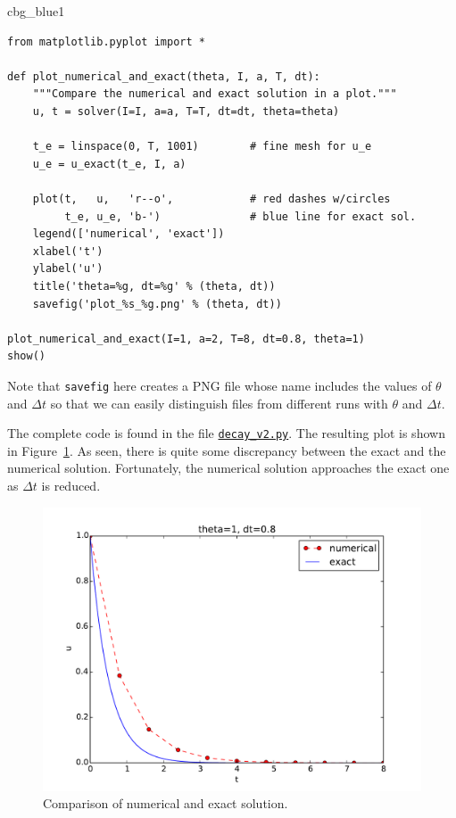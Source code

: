 \documentclass[%
oneside,                 %
final,                   %
10pt]{article}
\newenvironment{_cod_tight}[1]{
   \def\FrameCommand{\colorbox{#1}}
   \FrameRule0.6pt\MakeFramed {\FrameRestore}\vskip3mm}
   {\vskip0mm\endMakeFramed}
\newenvironment{cod}[1]{
\bgroup\rmfamily
\fboxsep=0mm\relax
\begin{_cod_tight}{#1}
\list{}{\parsep=-2mm\parskip=0mm\topsep=0pt\leftmargin=2mm
\rightmargin=2\leftmargin\leftmargin=4pt\relax}
\item\relax}
{\endlist\end{_cod_tight}\egroup}
\begin{document}
\begin{cod}{cbg_blue1}\begin{Verbatim}[numbers=none,fontsize=\fontsize{9pt}{9pt},baselinestretch=0.95,xleftmargin=2mm]
from matplotlib.pyplot import *

def plot_numerical_and_exact(theta, I, a, T, dt):
    """Compare the numerical and exact solution in a plot."""
    u, t = solver(I=I, a=a, T=T, dt=dt, theta=theta)

    t_e = linspace(0, T, 1001)        # fine mesh for u_e
    u_e = u_exact(t_e, I, a)

    plot(t,   u,   'r--o',            # red dashes w/circles
         t_e, u_e, 'b-')              # blue line for exact sol.
    legend(['numerical', 'exact'])
    xlabel('t')
    ylabel('u')
    title('theta=%g, dt=%g' % (theta, dt))
    savefig('plot_%s_%g.png' % (theta, dt))

plot_numerical_and_exact(I=1, a=2, T=8, dt=0.8, theta=1)
show()
\end{Verbatim}
\end{cod}
\noindent
Note that \texttt{savefig} here creates a PNG file whose name includes the
values of $\theta$ and $\Delta t$ so that we can easily distinguish
files from different runs with $\theta$ and $\Delta t$.

The complete code is found in the file
\href{{http://tinyurl.com/ofkw6kc/alg/decay_v2.py}}{\nolinkurl{decay_v2.py}}. The resulting plot
is shown in Figure~\ref{decay:fig:v2}. As seen, there is quite some
discrepancy between the exact and the numerical solution.
Fortunately, the numerical solution approaches the exact one as
$\Delta t$ is reduced.


\begin{figure}[!ht]  %
  \centerline{\includegraphics[width=0.8\linewidth]{fig-alg/decay_v2.pdf}}
  \caption{
  Comparison of numerical and exact solution. \label{decay:fig:v2}
  }
\end{figure}
\end{document}
